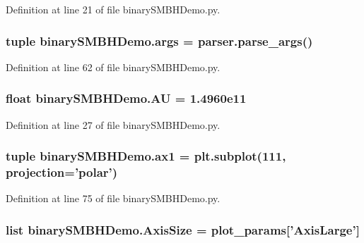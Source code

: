 Definition at line 21 of file binary\-S\-M\-B\-H\-Demo.\-py.

\hypertarget{namespacebinary_s_m_b_h_demo_a0681eb689082a253783319c9ad29abc6}{
\subsubsection[{args}]{\setlength{\rightskip}{0pt plus 5cm}tuple binary\-S\-M\-B\-H\-Demo.\-args = parser.\-parse\-\_\-args()}}\label{namespacebinary_s_m_b_h_demo_a0681eb689082a253783319c9ad29abc6}


Definition at line 62 of file binary\-S\-M\-B\-H\-Demo.\-py.

\hypertarget{namespacebinary_s_m_b_h_demo_a2ad6e51c36a32ffe33b3384e27ebe378}{
\subsubsection[{A\-U}]{\setlength{\rightskip}{0pt plus 5cm}float binary\-S\-M\-B\-H\-Demo.\-A\-U = 1.\-4960e11}}\label{namespacebinary_s_m_b_h_demo_a2ad6e51c36a32ffe33b3384e27ebe378}


Definition at line 27 of file binary\-S\-M\-B\-H\-Demo.\-py.

\hypertarget{namespacebinary_s_m_b_h_demo_ab1c5e5f1ec42e9833566bac273380470}{
\subsubsection[{ax1}]{\setlength{\rightskip}{0pt plus 5cm}tuple binary\-S\-M\-B\-H\-Demo.\-ax1 = plt.\-subplot(111, projection='polar')}}\label{namespacebinary_s_m_b_h_demo_ab1c5e5f1ec42e9833566bac273380470}


Definition at line 75 of file binary\-S\-M\-B\-H\-Demo.\-py.

\hypertarget{namespacebinary_s_m_b_h_demo_ab529335bcc305d4d0e7f0af5059c8d6b}{
\subsubsection[{Axis\-Size}]{\setlength{\rightskip}{0pt plus 5cm}list binary\-S\-M\-B\-H\-Demo.\-Axis\-Size = plot\-\_\-params\mbox{[}'Axis\-Large'\mbox{]}}}\label{namespacebinary_s_m_b_h_demo_ab529335bcc305d4d0e7f0af5059c8d6b}


